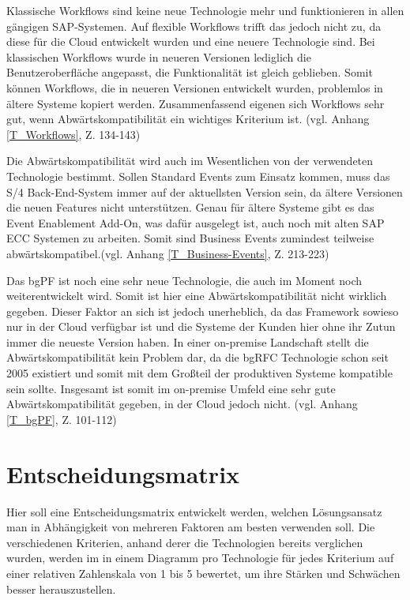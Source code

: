 Klassische Workflows sind keine neue Technologie mehr und funktionieren in allen gängigen SAP-Systemen. Auf flexible Workflows trifft das jedoch nicht zu, da diese für die Cloud entwickelt wurden und eine neuere Technologie sind. Bei klassischen Workflows wurde in neueren Versionen lediglich die Benutzeroberfläche angepasst, die Funktionalität ist gleich geblieben. Somit können Workflows, die in neueren Versionen entwickelt wurden, problemlos in ältere Systeme kopiert werden. Zusammenfassend eigenen sich Workflows sehr gut, wenn Abwärtskompatibilität ein wichtiges Kriterium ist. (vgl. Anhang \ref{T_Workflows}, Z. 134-143)

Die Abwärtskompatibilität wird auch im Wesentlichen von der verwendeten Technologie bestimmt. Sollen Standard Events zum Einsatz kommen, muss das S/4 Back-End-System immer auf der aktuellsten Version sein, da ältere Versionen die neuen Features nicht unterstützen. Genau für ältere Systeme gibt es das Event Enablement Add-On, was dafür ausgelegt ist, auch noch mit alten SAP ECC Systemen zu arbeiten. Somit sind Business Events zumindest teilweise abwärtskompatibel.(vgl. Anhang \ref{T_Business-Events}, Z. 213-223)

Das bgPF ist noch eine sehr neue Technologie, die auch im Moment noch weiterentwickelt wird. Somit ist hier eine Abwärtskompatibilität nicht wirklich gegeben. Dieser Faktor an sich ist jedoch unerheblich, da das Framework sowieso nur in der Cloud verfügbar ist und die Systeme der Kunden hier ohne ihr Zutun immer die neueste Version haben. In einer on-premise Landschaft stellt die Abwärtskompatibilität kein Problem dar, da die bgRFC Technologie schon seit 2005 existiert und somit mit dem Gro{\ss}teil der produktiven Systeme kompatible sein sollte. Insgesamt ist somit im on-premise Umfeld eine sehr gute Abwärtskompatibilität gegeben, in der Cloud jedoch nicht. (vgl. Anhang \ref{T_bgPF}, Z. 101-112)

\section{Entscheidungsmatrix}

Hier soll eine Entscheidungsmatrix entwickelt werden, welchen Lösungsansatz man in Abhängigkeit von mehreren Faktoren am besten verwenden soll. Die verschiedenen Kriterien, anhand derer die Technologien bereits verglichen wurden, werden im in einem Diagramm pro Technologie für jedes Kriterium auf einer relativen Zahlenskala von 1 bis 5 bewertet, um ihre Stärken und Schwächen besser herauszustellen.

